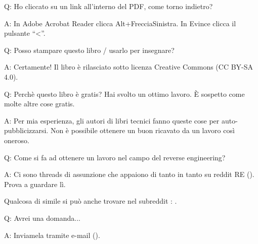 \par Q: Ho cliccato su un link all'interno del PDF, come torno indietro?
\par A: In Adobe Acrobat Reader clicca Alt+FrecciaSinistra. In Evince clicca il pulsante ``<''.

\par Q: Posso stampare questo libro / usarlo per insegnare?
\par A: Certamente! Il libro è rilasciato sotto licenza Creative Commons (CC BY-SA 4.0).

\par Q: Perchè questo libro è gratis? Hai svolto un ottimo lavoro. È sospetto come molte altre cose gratis.
\par A: Per mia esperienza, gli autori di libri tecnici fanno queste cose per auto-pubblicizzarsi. Non è possibile ottenere un buon ricavato da un lavoro così oneroso.

\par Q: Come si fa ad ottenere un lavoro nel campo del reverse engineering?
\par A: Ci sono threads di assunzione che appaiono di tanto in tanto su reddit RE\FNURLREDDIT{}
(\RedditHiringThread{}).
Prova a guardare lì.

Qualcosa di simile si può anche trovare nel subreddit : \NetsecHiringThread{}.

\par Q: Avrei una domanda...
\par A: Inviamela tramite e-mail (\EMAIL).
